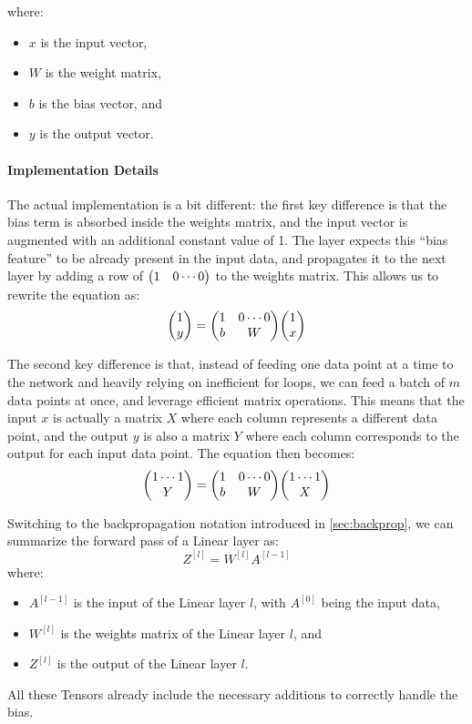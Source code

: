 where:
\begin{itemize}
    \item $x$ is the  input vector,
    \item $W$ is the \shape{\nout}{\nin} weight matrix,
    \item $b$ is the  bias vector, and
    \item $y$ is the  output vector.
\end{itemize}

\paragraph{Implementation Details} The actual implementation is a bit different: the first key difference is that the bias term is absorbed inside the weights matrix, and the input vector is augmented with an additional constant value of 1. The layer expects this ``bias feature'' to be already present in the input data, and propagates it to the next layer by adding a row of $\mqty(1 & 0 \cdots 0)$ to the weights matrix. This allows us to rewrite the equation as:
\begin{equation}
    \mqty( 1 \\ y ) = \mqty( 1 & 0 \cdots 0 \\ b & W ) \mqty( 1 \\ x )
\end{equation}

The second key difference is that, instead of feeding one data point at a time to the network and heavily relying on inefficient for loops, we can feed a batch of $m$ data points at once, and leverage efficient matrix operations. This means that the input $x$ is actually a matrix $X$ where each column represents a different data point, and the output $y$ is also a matrix $Y$ where each column corresponds to the output for each input data point. The equation then becomes:
\begin{equation}
    \mqty( 1 \cdots 1 \\ Y ) = \mqty( 1 & 0 \cdots 0 \\ b & W ) \mqty( 1 \cdots 1 \\ X )
\end{equation}

Switching to the backpropagation notation introduced in \cref{sec:backprop}, we can summarize the forward pass of a Linear layer as:
\begin{equation}
    Z^{[l]} = W^{[l]} A^{[l - 1]}
\end{equation}
where:
\begin{itemize}
    \item $A^{[l - 1]}$ is the  input of the Linear layer $l$, with $A^{[0]}$ being the input data,
    \item $W^{[l]}$ is the  weights matrix of the Linear layer $l$, and
    \item $Z^{[l]}$ is the  output of the Linear layer $l$.
\end{itemize}
All these Tensors already include the necessary additions to correctly handle the bias.

